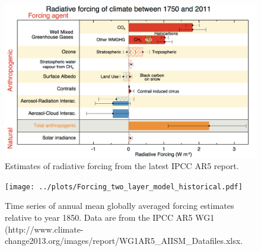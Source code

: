 \documentclass[12pt]{book}
\begin{document}
\begin{figure}[b!]
\begin{center}
\includegraphics[width=12 cm]{../external_figures/AR5_radiative_forcing.png}
\end{center}
\caption{ Estimates of radiative forcing from the latest IPCC AR5 report. } 
\label{fig:ipcc_forcing}
\end{figure}

\begin{figure}
\begin{center}
\texttt{[image: ../plots/Forcing\_two\_layer\_model\_historical.pdf]}
\end{center}
\caption{ Time series of annual mean globally averaged forcing estimates relative to year 1850.  Data are from the IPCC AR5 WG1 (http://www.climate-change2013.org/images/report/WG1AR5\_AIISM\_Datafiles.xlsx. } 
\label{fig:historical_forcing}
\end{figure}
\end{document}
